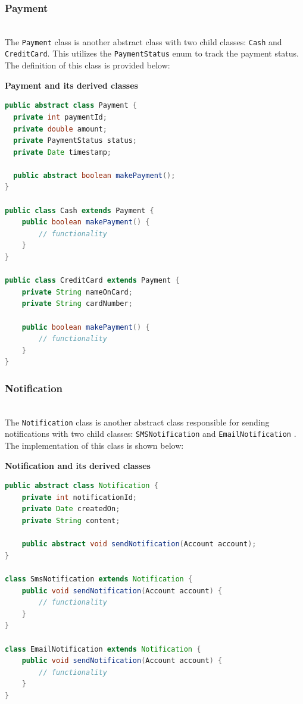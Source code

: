 \subsubsection{Payment}\label{X526vRzSK5KV3s-gUqVJ3}
\\
The \texttt{Payment} class is another abstract class with two child classes: \texttt{Cash} and \texttt{CreditCard}. This utilizes the \texttt{PaymentStatus} enum to track the payment status. The definition of this class is provided below:

\textbf{Payment and its derived classes}

\begin{lstlisting}[language=Java]
public abstract class Payment {
  private int paymentId;
  private double amount;
  private PaymentStatus status;
  private Date timestamp;

  public abstract boolean makePayment();
}

public class Cash extends Payment {
    public boolean makePayment() {
        // functionality
    }
}

public class CreditCard extends Payment {
    private String nameOnCard;
    private String cardNumber;

    public boolean makePayment() {
        // functionality
    }
}
\end{lstlisting}

\subsubsection{Notification}\label{Bqb3JAkjP5oef7tysf05a}
\\
The \texttt{Notification} class is another abstract class responsible for sending notifications with two child classes: \texttt{SMSNotification} and \texttt{EmailNotification} . The implementation of this class is shown below:

\textbf{Notification and its derived classes }

\begin{lstlisting}[language=Java]
public abstract class Notification {
    private int notificationId;
    private Date createdOn;      
    private String content;

    public abstract void sendNotification(Account account);
}

class SmsNotification extends Notification {
    public void sendNotification(Account account) {
        // functionality 
    }
}

class EmailNotification extends Notification {
    public void sendNotification(Account account) {
        // functionality 
    }
}
\end{lstlisting}

